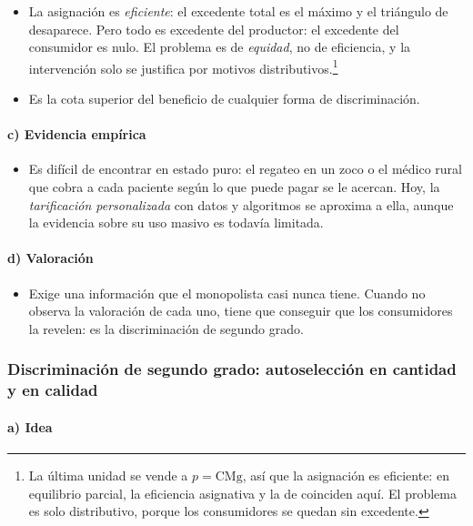 \documentclass[11pt]{article}
\begin{document}
\begin{itemize}
\item La asignación es \emph{eficiente}: el excedente total es el máximo y el triángulo de  desaparece. Pero todo es excedente del productor: el excedente del consumidor es nulo. El problema es de \emph{equidad}, no de eficiencia, y la intervención solo se justifica por motivos distributivos.\footnote{La última unidad se vende a $p=\mathrm{CMg}$, así que la asignación es eficiente: en equilibrio parcial, la eficiencia asignativa y la de  coinciden aquí. El problema es solo distributivo, porque los consumidores se quedan sin excedente.}
\item Es la cota superior del beneficio de cualquier forma de discriminación.
\end{itemize}

\paragraph{c) Evidencia empírica}

\begin{itemize}
\item Es difícil de encontrar en estado puro: el regateo en un zoco o el médico rural que cobra a cada paciente según lo que puede pagar se le acercan. Hoy, la \emph{tarificación personalizada} con datos y algoritmos se aproxima a ella, aunque la evidencia sobre su uso masivo es todavía limitada.
\end{itemize}

\paragraph{d) Valoración}

\begin{itemize}
\item Exige una información que el monopolista casi nunca tiene. Cuando no observa la valoración de cada uno, tiene que conseguir que los consumidores la revelen: es la discriminación de segundo grado.
\end{itemize}

\subsubsection{Discriminación de segundo grado: autoselección en cantidad y en calidad}\label{sec:discriminacion-segundo-grado}

\paragraph{a) Idea}
\end{document}
